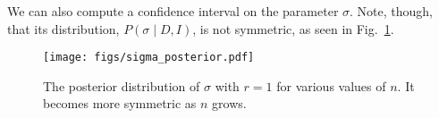 We can also compute a confidence interval on the parameter $\sigma$.
Note, though, that its distribution, $P(\sigma \mid D, I)$, is not
symmetric, as seen in Fig.~\ref{fig:l02_sigma_post}.

\begin{figure}[h]
\centerline{
        \texttt{[image: figs/sigma\_posterior.pdf]}}
      \caption{The posterior distribution of $\sigma$ with $r = 1$ for
        various values of $n$.  It becomes more symmetric as $n$ grows.}
\label{fig:l02_sigma_post}
\end{figure}
